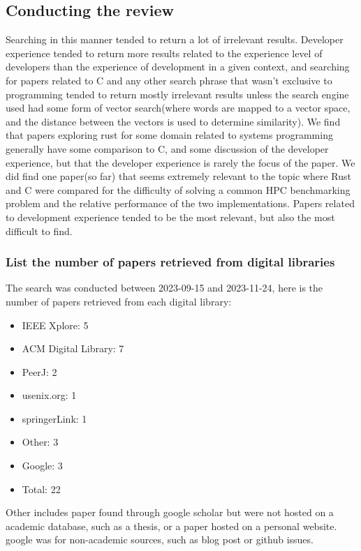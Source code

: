 \documentclass[conference]{IEEEtran}
\begin{document}
\subsection{\color{Black} Conducting the review}
\label{conducted_review}
{
    Searching in this manner tended to return a lot of irrelevant results. Developer experience tended to return more results related to the experience level of developers than the experience of development in a given context, and searching for papers related to C and any other search phrase that wasn't exclusive to programming tended to return mostly irrelevant results
    unless the search engine used had some form of vector search(where words are mapped to a vector space, and the distance between the vectors is used to determine similarity). We find that papers exploring rust for some domain related to systems programming generally have some comparison to C, and some discussion of the developer experience, but that the developer experience is rarely the focus of the paper.
    We did find one paper(so far) that seems extremely relevant to the topic where Rust and C were compared for the difficulty of solving a common HPC benchmarking problem and the relative performance of the two implementations. Papers related to development experience tended to be the most relevant, but also the most difficult to find.
}

\subsubsection{\color{Black}List the number of papers retrieved from digital libraries}
{The search was conducted between 2023-09-15 and 2023-11-24, here is the number of papers retrieved from each digital library:}
\begin{itemize}
    \item IEEE Xplore: 5
    \item ACM Digital Library: 7
    \item PeerJ: 2
    \item usenix.org: 1
    \item springerLink: 1
    \item Other: 3
    \item Google: 3
    \item Total: 22
\end{itemize}

Other includes paper found through google scholar but were not hosted on a academic database, such as a thesis, or a paper hosted on a personal website.
google was for non-academic sources, such as blog post or github issues.
\end{document}
